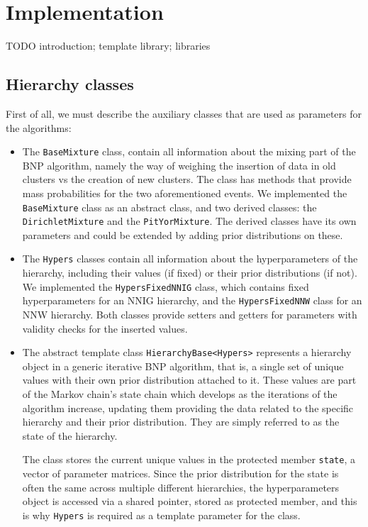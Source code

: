 
\chapter{Implementation}
TODO introduction; template library; libraries

\section{Hierarchy classes}
First of all, we must describe the auxiliary classes that are used as parameters for the algorithms:
\begin{itemize}
	\item The \verb|BaseMixture| class, contain all information about the mixing part of the BNP algorithm, namely the way of weighing the insertion of data in old clusters vs the creation of new clusters. The class has methods that provide mass probabilities for the two aforementioned events. We implemented the \verb|BaseMixture| class as an abstract class, and two derived classes: the \verb|DirichletMixture| and the \verb|PitYorMixture|. The derived classes have its own parameters and could be extended by adding prior distributions on these.

	\item The \verb|Hypers| classes contain all information about the hyperparameters of the hierarchy, including their values (if fixed) or their prior distributions (if not). We implemented the \verb|HypersFixedNNIG| class, which contains fixed hyperparameters for an NNIG hierarchy, and the \verb|HypersFixedNNW| class for an NNW hierarchy. Both classes provide setters and getters for parameters with validity checks for the inserted values.
	
	\item The abstract template class \verb|HierarchyBase<Hypers>| represents a hierarchy object in a generic iterative BNP algorithm, that is, a single set of unique values with their own prior
distribution attached to it. These values are part of the Markov chain's
state chain which develops as the iterations of the algorithm increase, updating them providing the data related to the specific hierarchy and their prior distribution.
They are simply referred to as the state of the hierarchy. 

The class stores the current unique values in the protected member \verb|state|, a vector of parameter matrices.
Since the prior distribution for the state is often the same across multiple
different hierarchies, the hyperparameters object is accessed via a shared
pointer, stored as protected member, and this is why \verb|Hypers| is required as a template parameter for the class. 


\end{itemize}
